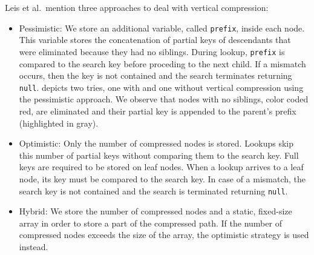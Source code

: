 \documentclass[abstracton,12pt]{scrartcl}
\theoremstyle{definition}
\begin{document}
Leis et al.\ mention three approaches to deal with vertical compression:
\begin{itemize}
  \item Pessimistic: We store an additional variable, called \texttt{prefix},
    inside each node. This variable stores the concatenation of partial keys
    of descendants that were eliminated because they had no siblings. During
    lookup, \texttt{prefix} is compared to the search key before proceding to
    the next child. If a mismatch occurs, then the key is not contained and
    the search terminates returning \texttt{null}.
     depicts two tries, one 
    with and one without vertical compression using the pessimistic approach.
    We observe that nodes with no siblings, color coded red, are eliminated 
    and their partial key is appended to the parent's prefix (highlighted in
    gray).

  \item Optimistic: Only the number of compressed nodes is stored. Lookups
    skip this number of partial keys without comparing them to the search
    key. Full keys are required to be stored on leaf nodes. When a lookup 
    arrives to a leaf node, its key must be compared to the search key.
    In case of a mismatch, the search key is not contained and the search is 
    terminated returning \texttt{null}.

  \item Hybrid: We store the number of compressed nodes and a static, 
    fixed-size array in order to store a part of the compressed path. If the 
    number of compressed nodes exceeds the size of the array, the optimistic 
    strategy is used instead.
\end{itemize}
\end{document}
